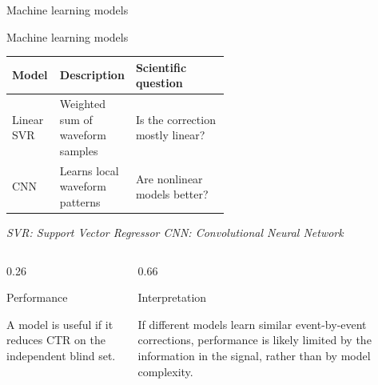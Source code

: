 \begin{frame}{Machine learning models}

\small

\begin{block}{Machine learning models}

\begin{tabularx}{\linewidth}{@{}p{0.22\linewidth}p{0.32\linewidth}X@{}}

\toprule

\textbf{Model} & \textbf{Description} & \textbf{Scientific question}\\

\midrule

Linear SVR
& Weighted sum of waveform samples
& Is the correction mostly linear?\\[1em]

CNN
& Learns local waveform patterns
& Are nonlinear models better?\\[1em]
\bottomrule

\end{tabularx}

\vspace{0.35em}

\scriptsize
\textit{SVR: Support Vector Regressor \hspace{1.5em} CNN: Convolutional Neural Network}

\end{block}

\vspace{0.3em}

\begin{columns}[T,totalwidth=\textwidth]

\begin{column}{0.26\textwidth}

\begin{block}{Performance}

A model is useful if it reduces CTR on the independent blind set.

\end{block}

\end{column}

\begin{column}{0.66\textwidth}

\begin{alertblock}{Interpretation}

If different models learn similar event-by-event corrections,
performance is likely limited by the information in the signal,
rather than by model complexity.

\end{alertblock}

\end{column}

\end{columns}

\end{frame}